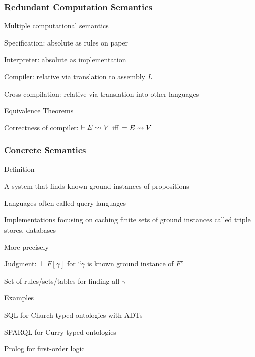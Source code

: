 \begin{frame}\frametitle{Redundant Computation Semantics}
\begin{blockitems}{Multiple computational semantics}
\item Specification: absolute as rules on paper
\item Interpreter: absolute as implementation
\item Compiler: relative via translation to assembly $L$
\item Cross-compilation: relative via translation into other languages
\end{blockitems}

\begin{blockitems}{Equivalence Theorems}
\item Correctness of compiler: $\vdash E\rightsquigarrow V$ iff $\models E\rightsquigarrow V$
\end{blockitems}
\end{frame}

\begin{frame}\frametitle{Concrete Semantics}
\begin{blockitems}{Definition}
\item A system that finds known ground instances of propositions
\item Languages often called query languages
\item Implementations focusing on caching finite sets of ground instances called triple stores, databases
\end{blockitems}


\begin{blockitems}{More precisely}
\item Judgment: $\vdash F[\gamma]$ for ``$\gamma$ is known ground instance of $F$''
\item Set of rules/sets/tables for finding all $\gamma$
\end{blockitems}

\begin{blockitems}{Examples}
\item SQL for Church-typed ontologies with ADTs
\item SPARQL for Curry-typed ontologies
\item Prolog for first-order logic
\end{blockitems}
\end{frame}

